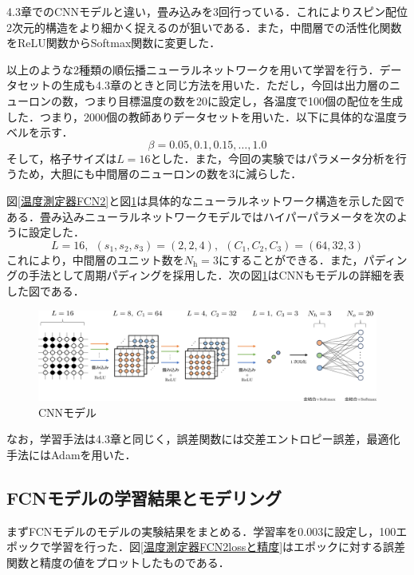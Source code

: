 \documentclass[a4paper,11pt]{jsreport}
\begin{document}
4.3章でのCNNモデルと違い，畳み込みを3回行っている．これによりスピン配位2次元的構造をより細かく捉えるのが狙いである．また，中間層での活性化関数をReLU関数からSoftmax関数に変更した．\par
以上のような2種類の順伝播ニューラルネットワークを用いて学習を行う．データセットの生成も4.3章のときと同じ方法を用いた．ただし，今回は出力層のニューロンの数，つまり目標温度の数を20に設定し，各温度で100個の配位を生成した．つまり，2000個の教師ありデータセットを用いた．以下に具体的な温度ラベルを示す．
\begin{equation}
  \beta = 0.05, 0.1, 0.15, \dots, 1.0
\end{equation}
そして，格子サイズは$L=16$とした．また，今回の実験ではパラメータ分析を行うため，大胆にも中間層のニューロンの数を3に減らした．\par
図\ref{温度測定器FCN2}と図\ref{温度測定器CNN2}は具体的なニューラルネットワーク構造を示した図である．畳み込みニューラルネットワークモデルではハイパーパラメータを次のように設定した．
\begin{equation}
  L = 16, \ \ (s_1, s_2, s_3) = (2, 2, 4), \ \ (C_1, C_2, C_3) = (64, 32, 3)
\end{equation}
これにより，中間層のユニット数を$N_{\text{h}}=3$にすることができる．また，パディングの手法として周期パディングを採用した．次の図\ref{温度測定器CNN2}はCNNもモデルの詳細を表した図である．

\begin{figure}[H]
  \begin{center}
      \includegraphics[width=\linewidth]{image/温度測定器CNN2.png}
      \caption{CNNモデル}
      \label{温度測定器CNN2}
  \end{center}
\end{figure}

なお，学習手法は4.3章と同じく，誤差関数には交差エントロピー誤差，最適化手法にはAdamを用いた．

\subsection{FCNモデルの学習結果とモデリング}
まずFCNモデルのモデルの実験結果をまとめる．学習率を0.003に設定し，100エポックで学習を行った．図\ref{温度測定器FCN2lossと精度}はエポックに対する誤差関数と精度の値をプロットしたものである．
\end{document}
